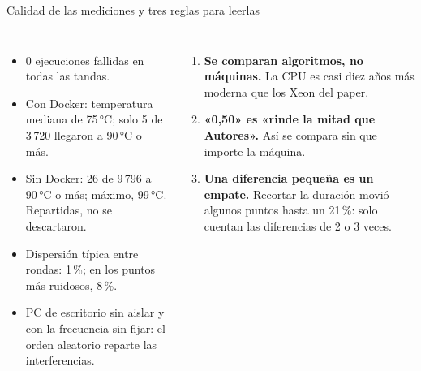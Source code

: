 \begin{frame}{Calidad de las mediciones y tres reglas para leerlas}
  \begin{columns}[T]
    \begin{itemize}\footnotesize
      \item 0 ejecuciones fallidas en todas las tandas.
      \item Con Docker: temperatura mediana de 75\,°C; solo 5 de 3\,720 llegaron a 90\,°C o más.
      \item Sin Docker: 26 de 9\,796 a 90\,°C o más; máximo, 99\,°C. Repartidas, no se descartaron.
      \item Dispersión típica entre rondas: 1\,\%; en los puntos más ruidosos, 8\,\%.
      \item PC de escritorio sin aislar y con la frecuencia sin fijar: el orden aleatorio reparte las interferencias.
    \end{itemize}
    \begin{enumerate}\footnotesize
      \item \textbf{Se comparan algoritmos, no máquinas.} La CPU es casi diez años más moderna que los Xeon del paper.
      \item \textbf{«0,50\por» es «rinde la mitad que Autores».} Así se compara sin que importe la máquina.
      \item \textbf{Una diferencia pequeña es un empate.} Recortar la duración movió algunos puntos hasta un 21\,\%: solo cuentan las diferencias de 2 o 3 veces.
    \end{enumerate}
  \end{columns}
\end{frame}
